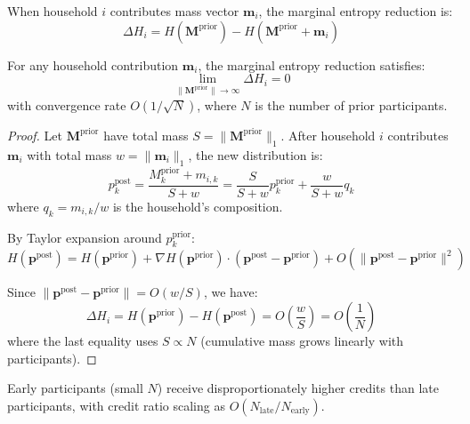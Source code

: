 \documentclass[12pt,a4paper]{article}
\begin{document}
\begin{definition}
When household $i$ contributes mass vector $\mathbf{m}_i$, the marginal entropy reduction is:
\begin{equation}
\Delta H_i = H(\mathbf{M}^{\text{prior}}) - H(\mathbf{M}^{\text{prior}} + \mathbf{m}_i)
\end{equation}
\end{definition}

\begin{theorem}
\label{thm:dmer}
For any household contribution $\mathbf{m}_i$, the marginal entropy reduction satisfies:
\begin{equation}
\lim_{\|\mathbf{M}^{\text{prior}}\| \to \infty} \Delta H_i = 0
\end{equation}
with convergence rate $O(1/\sqrt{N})$, where $N$ is the number of prior participants.
\end{theorem}

\begin{proof}
Let $\mathbf{M}^{\text{prior}}$ have total mass $S = \|\mathbf{M}^{\text{prior}}\|_1$. After household $i$ contributes $\mathbf{m}_i$ with total mass $w = \|\mathbf{m}_i\|_1$, the new distribution is:
\begin{equation}
p_k^{\text{post}} = \frac{M_k^{\text{prior}} + m_{i,k}}{S + w} = \frac{S}{S+w} p_k^{\text{prior}} + \frac{w}{S+w} q_k
\end{equation}
where $q_k = m_{i,k}/w$ is the household's composition.

By Taylor expansion around $p_k^{\text{prior}}$:
\begin{equation}
H(\mathbf{p}^{\text{post}}) = H(\mathbf{p}^{\text{prior}}) + \nabla H(\mathbf{p}^{\text{prior}}) \cdot (\mathbf{p}^{\text{post}} - \mathbf{p}^{\text{prior}}) + O(\|\mathbf{p}^{\text{post}} - \mathbf{p}^{\text{prior}}\|^2)
\end{equation}

Since $\|\mathbf{p}^{\text{post}} - \mathbf{p}^{\text{prior}}\| = O(w/S)$, we have:
\begin{equation}
\Delta H_i = H(\mathbf{p}^{\text{prior}}) - H(\mathbf{p}^{\text{post}}) = O\left(\frac{w}{S}\right) = O\left(\frac{1}{N}\right)
\end{equation}
where the last equality uses $S \propto N$ (cumulative mass grows linearly with participants).
\end{proof}

\begin{corollary}
Early participants (small $N$) receive disproportionately higher credits than late participants, with credit ratio scaling as $O(N_{\text{late}}/N_{\text{early}})$.
\end{corollary}
\end{document}
